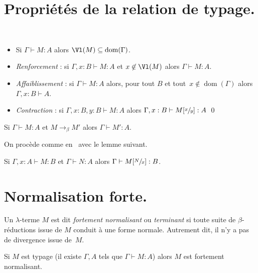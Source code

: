 \documentclass[./main]{subfiles}
\begin{document}
  \section{Propriétés de la relation de typage.}

  \begin{lem}
    ~\\[-1.5\baselineskip]

    \begin{itemize}
      \item Si $\Gamma \vdash M : A$ alors $\Vl(M) \subseteq \operatorname{dom}(\Gamma)$.
      \item \textit{Renforcement} : si $\Gamma , x : B \vdash M : A$ et $x \not\in \Vl(M)$ alors $\Gamma \vdash M : A$.
      \item \textit{Affaiblissement} : si $\Gamma \vdash M : A$ alors, pour tout $B$ et tout~$x \not\in \operatorname{dom}(\Gamma)$ alors~$\Gamma, x : B \vdash A$.
      \item \textit{Contraction} : si $\Gamma, x : B, y : B \vdash M : A$ alors $\Gamma, x : B \vdash M[\sfrac{x}{y}] : A$ \qed
    \end{itemize}
  \end{lem}

  \begin{prop}
    Si $\Gamma \vdash M : A$ et $M \to_\beta M'$ alors $\Gamma \vdash M' : A$.
  \end{prop}
  \begin{prv}
    On procède comme en \thprog\ avec le lemme suivant.
    \begin{lem}
      Si $\Gamma, x : A \vdash M : B$ et $\Gamma \vdash N : A$ alors $\Gamma \vdash M[\sfrac{N}{x}] : B$.
    \end{lem}
  \end{prv}

  \section{Normalisation forte.}

  \begin{defn}
    Un $\lambda$-terme $M$ est dit \textit{fortement normalisant} ou \textit{terminant} si toute suite de $\beta$-réductions issue de $M$ conduit à une forme normale. Autrement dit, il n'y a pas de divergence issue de~$M$.
  \end{defn}

  \begin{thm}
    Si $M$ est typage (il existe $\Gamma, A$ tels que  $\Gamma \vdash M : A$) alors $M$ est fortement normalisant.
  \end{thm}
\end{document}
